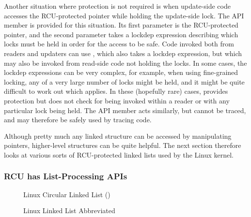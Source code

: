 Another situation where protection is not required is when update-side code
accesses the RCU-protected pointer while holding the update-side lock.
The  API member is provided for this
situation.
Its first parameter is the RCU-protected pointer, and the second
parameter takes a lockdep expression describing which locks must be
held in order for the access to be safe.
Code invoked both from readers and updaters can use
, which also takes a lockdep expression, but
which may also be invoked from read-side code not holding the locks.
In some cases, the lockdep expressions can be very complex, for example,
when using fine-grained locking, any of a very large number of locks
might be held, and it might be quite difficult to work out which applies.
In these (hopefully rare) cases,  provides
protection but does not check for being invoked within a reader or with
any particular lock being held.
The  API member acts similarly, but
cannot be traced, and may therefore be safely used by tracing code.

Although pretty much any linked structure can be accessed by manipulating
pointers, higher-level structures can be quite helpful.
The next section therefore looks at various sorts of RCU-protected
linked lists used by the Linux kernel.

\fi

\subsubsection{RCU has List-Processing APIs}
\label{sec:defer:RCU has List-Processing APIs}

\begin{figure}[tb]
\centering
{}
\caption{Linux Circular Linked List ()}
\label{fig:defer:Linux Circular Linked List (list)}
\end{figure}

\begin{figure}[tb]
\centering
{}
\caption{Linux Linked List Abbreviated}
\label{fig:defer:Linux Linked List Abbreviated}
\end{figure}

